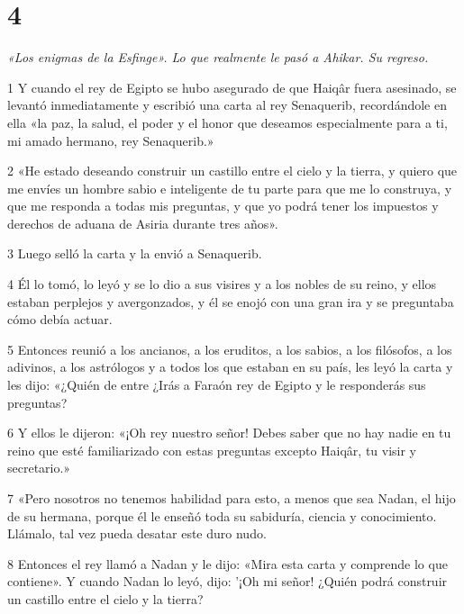 \chapter{4}

\par \textit{«Los enigmas de la Esfinge». Lo que realmente le pasó a Ahikar. Su regreso.}

\par 1 Y cuando el rey de Egipto se hubo asegurado de que Haiqâr fuera asesinado, se levantó inmediatamente y escribió una carta al rey Senaquerib, recordándole en ella «la paz, la salud, el poder y el honor que deseamos especialmente para a ti, mi amado hermano, rey Senaquerib.»

\par 2 «He estado deseando construir un castillo entre el cielo y la tierra, y quiero que me envíes un hombre sabio e inteligente de tu parte para que me lo construya, y que me responda a todas mis preguntas, y que yo podrá tener los impuestos y derechos de aduana de Asiria durante tres años».

\par 3 Luego selló la carta y la envió a Senaquerib.

\par 4 Él lo tomó, lo leyó y se lo dio a sus visires y a los nobles de su reino, y ellos estaban perplejos y avergonzados, y él se enojó con una gran ira y se preguntaba cómo debía actuar.

\par 5 Entonces reunió a los ancianos, a los eruditos, a los sabios, a los filósofos, a los adivinos, a los astrólogos y a todos los que estaban en su país, les leyó la carta y les dijo: «¿Quién de entre ¿Irás a Faraón rey de Egipto y le responderás sus preguntas?

\par 6 Y ellos le dijeron: «¡Oh rey nuestro señor! Debes saber que no hay nadie en tu reino que esté familiarizado con estas preguntas excepto Haiqâr, tu visir y secretario.»

\par 7 «Pero nosotros no tenemos habilidad para esto, a menos que sea Nadan, el hijo de su hermana, porque él le enseñó toda su sabiduría, ciencia y conocimiento. Llámalo, tal vez pueda desatar este duro nudo.

\par 8 Entonces el rey llamó a Nadan y le dijo: «Mira esta carta y comprende lo que contiene». Y cuando Nadan lo leyó, dijo: '¡Oh mi señor! ¿Quién podrá construir un castillo entre el cielo y la tierra?


